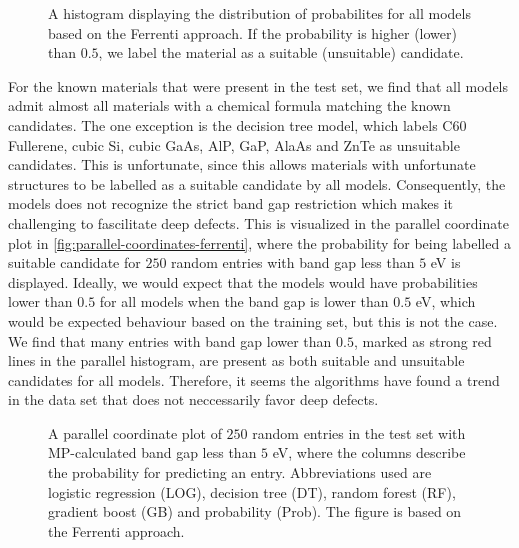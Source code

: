 \begin{figure}[ht!]
    \centering
    
    \vspace*{-130mm}
    \caption{A histogram displaying the distribution of probabilites for all models based on the Ferrenti approach. If the probability is higher (lower) than $0.5$, we label the material as a suitable (unsuitable) candidate.}
    \label{fig:histogram-ferrenti}
\end{figure}

For the known materials that were present in the test set, we find that all models admit almost all materials with a chemical formula matching the known candidates. The one exception is the decision tree model, which labels C60 Fullerene, cubic Si, cubic GaAs, AlP, GaP, AlaAs and ZnTe as unsuitable candidates. This is unfortunate, since this allows materials with unfortunate structures to be labelled as a suitable candidate by all models. Consequently, the models does not recognize the strict band gap restriction which makes it challenging to fascilitate deep defects. This is visualized in the parallel coordinate plot in \autoref{fig:parallel-coordinates-ferrenti}, where the probability for being labelled a suitable candidate for $250$ random entries with band gap less than $5$ eV is displayed. Ideally, we would expect that the models would have probabilities lower than $0.5$ for all models when the band gap is lower than $0.5$ eV, which would be expected behaviour based on the training set, but this is not the case. We find that many entries with band gap lower than $0.5$, marked as strong red lines in the parallel histogram, are present as both suitable and unsuitable candidates for all models. Therefore, it seems the algorithms have found a trend in the data set that does not neccessarily favor deep defects.

\begin{figure}[ht!]
    \centering
    
    \vspace*{-130mm}
    \caption{A parallel coordinate plot of $250$ random entries in the test set with MP-calculated band gap less than $5$ eV, where the columns describe the probability for predicting an entry. Abbreviations used are logistic regression (LOG), decision tree (DT), random forest (RF), gradient boost (GB) and probability (Prob). The figure is based on the Ferrenti approach.}
    \label{fig:parallel-coordinates-ferrenti}
\end{figure}


